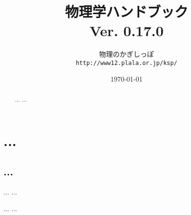 \documentclass[a4j,10pt,oneside,openany]{jsbook}
\title{{\Huge \textbf{物理学ハンドブック}}\\ {\small Ver. 0.17.0}}
\author{物理のかぎしっぽ\\ \texttt{http://www12.plala.or.jp/ksp/}}
\date{\today}
\begin{document}
%
%
\maketitle
\frontmatter
\tableofcontents
%
%
\mainmatter

\chapter{...}
\begin{abstract}
...
...
\end{abstract}

\section{...}
...
...

\begin{thebibliography}{20}
 ...
  ...
  \end{thebibliography}

  \newpage
  \printindex
  
\end{document}
